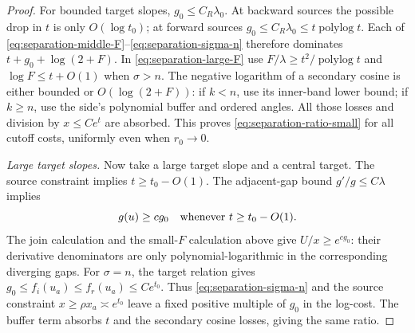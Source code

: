 \begin{proof}
For bounded target slopes,
$g_0\leq C_R\lambda_0$.  At backward sources the possible
drop in $t$ is only $O(\log t_0)$; at forward sources
$g_0\leq C_R\lambda_0\leq t\operatorname{polylog}t$.
Each of \eqref{eq:separation-middle-F}--\eqref{eq:separation-sigma-n}
therefore dominates $t+g_0+\log(2+F)$.  In
\eqref{eq:separation-large-F} use
$F/\lambda\geq t^2/\operatorname{polylog}t$ and
$\log F\leq t+O(1)$ when $\sigma>n$.
The negative logarithm of a secondary cosine is either bounded
or $O(\log(2+F))$: if $k<n$, use its inner-band lower bound;
if $k\geq n$, use the side's polynomial buffer and ordered
angles.  All those losses and division by $x\leq Ce^t$ are
absorbed.  This proves \eqref{eq:separation-ratio-small} for
all cutoff costs, uniformly even when $r_0\to0$.

\emph{Large target slopes.}
Now take a large target slope and a central target.  The source
constraint implies $t\geq t_0-O(1)$.  The adjacent-gap bound
$g'/g\leq C\lambda$ implies
\begin{equation}\label{eq:separation-large-backstep}
 g(u)\geq c g_0
 \quad\hbox{whenever }t\geq t_0-O(1).
\end{equation}
The join calculation and the small-$F$ calculation above give
$U/x\geq e^{c g_0}$: their derivative denominators are only
polynomial-logarithmic in the corresponding diverging gaps.
For $\sigma=n$, the target relation gives
$g_0\leq f_i(u_a)\leq f_r(u_a)\leq Ce^{t_0}$.
Thus \eqref{eq:separation-sigma-n} and the source constraint
$x\geq\rho x_a\asymp e^{t_0}$ leave a fixed positive multiple
of $g_0$ in the log-cost.  The buffer term absorbs $t$ and the
secondary cosine losses, giving the same ratio.


\end{proof}

